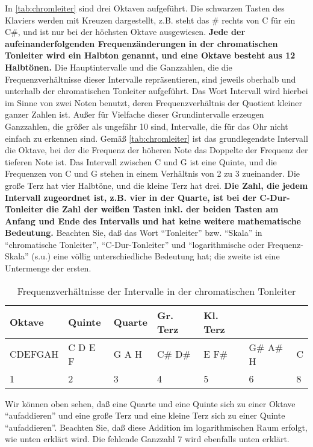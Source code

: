 In \autoref{tab:chromleiter} sind drei Oktaven aufgeführt.
Die schwarzen Tasten des Klaviers werden mit Kreuzen dargestellt, z.B. steht das \# rechts von C für ein C\#, und ist nur bei der höchsten Oktave ausgewiesen.
\textbf{Jede der aufeinanderfolgenden Frequenzänderungen in der chromatischen Tonleiter wird ein Halbton genannt, und eine Oktave besteht aus 12 Halbtönen.}
Die Hauptintervalle und die Ganzzahlen, die die Frequenzverhältnisse dieser Intervalle repräsentieren, sind jeweils oberhalb und unterhalb der chromatischen Tonleiter aufgeführt.
Das Wort Intervall wird hierbei im Sinne von zwei Noten benutzt, deren Frequenzverhältnis der Quotient kleiner ganzer Zahlen ist.
Außer für Vielfache dieser Grundintervalle erzeugen Ganzzahlen, die größer als ungefähr 10 sind, Intervalle, die für das Ohr nicht einfach zu erkennen sind.
Gemäß \autoref{tab:chromleiter} ist das grundlegendste Intervall die Oktave, bei der die Frequenz der höheren Note das Doppelte der Frequenz der tieferen Note ist.
Das Intervall zwischen C und G ist eine Quinte, und die Frequenzen von C und G stehen in einem Verhältnis von 2 zu 3 zueinander.
Die große Terz hat vier Halbtöne, und die kleine Terz hat drei.
\textbf{Die Zahl, die jedem Intervall zugeordnet ist, z.B. vier in der Quarte, ist bei der C-Dur-Tonleiter die Zahl der weißen Tasten inkl. der beiden Tasten am Anfang und Ende des Intervalls und hat keine weitere mathematische Bedeutung.}
Beachten Sie, daß das Wort \enquote{Tonleiter} bzw. \enquote{Skala} in \enquote{chromatische Tonleiter}, \enquote{C-Dur-Tonleiter} und \enquote{logarithmische oder Frequenz-Skala} (s.u.) eine völlig unterschiedliche Bedeutung hat; die zweite ist eine Untermenge der ersten.

\begin{table}
 \label{tab:chromleiter}
 \begin{tabular}{l|l|l|l|l|l|l}
  \textbf{Oktave} & \textbf{Quinte} & \textbf{Quarte} & \textbf{Gr. Terz} & \textbf{Kl. Terz} & & \\
  \hline
  CDEFGAH & C D E F & G A H & C\# D\# & E F\# & G\# A\# H & C \\
  1 & 2 & 3 & 4 & 5 & 6 & 8 \\
  \end{tabular}
 \caption{Frequenzverhältnisse der Intervalle in der chromatischen Tonleiter}
\end{table}

Wir können oben sehen, daß eine Quarte und eine Quinte sich zu einer Oktave \enquote{aufaddieren} und eine große Terz und eine kleine Terz sich zu einer Quinte \enquote{aufaddieren}.
Beachten Sie, daß diese Addition im logarithmischen Raum erfolgt, wie unten erklärt wird.
Die fehlende Ganzzahl 7 wird ebenfalls unten erklärt.
 


